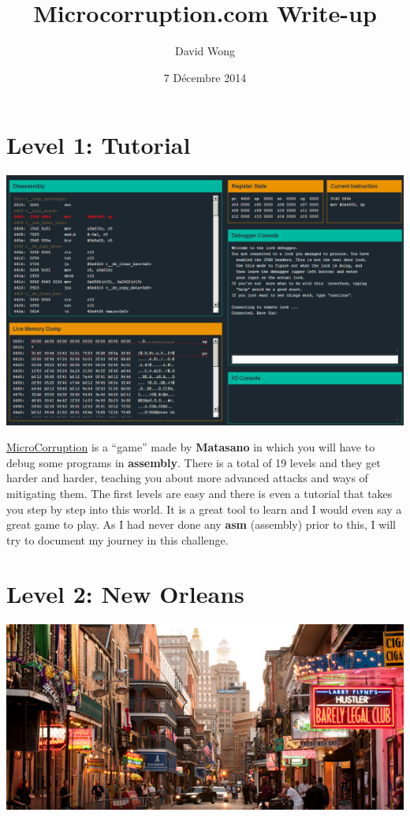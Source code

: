 \documentclass[a4paper,11pt]{article}
\title{Microcorruption.com Write-up}
\author{David Wong}
\date{7 Décembre 2014}
\begin{document}
\maketitle


\section{Level 1: Tutorial}\label{level-1-tutorial}

\includegraphics{img/1_1.png}

\href{http://microcorruption.com/}{MicroCorruption} is a ``game'' made
by \textbf{Matasano} in which you will have to debug some programs in
\textbf{assembly}. There is a total of 19 levels and they get harder and
harder, teaching you about more advanced attacks and ways of mitigating
them. The first levels are easy and there is even a tutorial that takes
you step by step into this world. It is a great tool to learn and I
would even say a great game to play. As I had never done any
\textbf{asm} (assembly) prior to this, I will try to document my journey
in this challenge.

\section{Level 2: New Orleans}\label{level-2-new-orleans}

\includegraphics{img/2_3.png}
\end{document}
